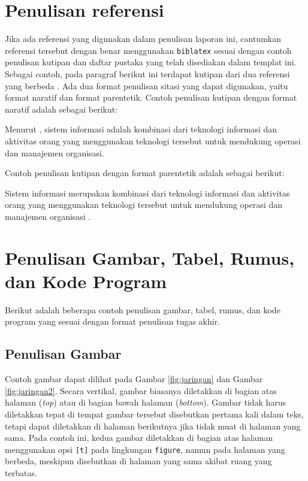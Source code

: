 \section{Penulisan referensi}
Jika ada referensi yang digunakan dalam penulisan laporan ini, cantumkan referensi tersebut dengan benar menggunakan \texttt{biblatex} sesuai dengan contoh penulisan kutipan dan daftar pustaka yang telah disediakan dalam templat ini.
Sebagai contoh, pada paragraf berikut ini terdapat kutipan dari dua referensi yang berbeda \autocite{laudon2020, pressman2019}. 
Ada dua format penulisan sitasi yang dapat digunakan, yaitu format naratif dan format parentetik.
Contoh penulisan kutipan dengan format naratif adalah sebagai berikut:
\begin{displayquote}
Menurut \textcite{laudon2020}, sistem informasi adalah kombinasi dari teknologi informasi dan aktivitas orang yang menggunakan teknologi tersebut untuk mendukung operasi dan manajemen organisasi.
\end{displayquote}
Contoh penulisan kutipan dengan format parentetik adalah sebagai berikut:
\begin{displayquote}
    Sistem informasi merupakan kombinasi dari teknologi informasi dan aktivitas orang yang menggunakan teknologi tersebut untuk mendukung operasi dan manajemen organisasi \autocite{laudon2020}.
\end{displayquote}

\section{Penulisan Gambar, Tabel, Rumus, dan Kode Program}
Berikut adalah beberapa contoh penulisan gambar, tabel, rumus, dan kode program yang sesuai dengan format penulisan tugas akhir.
\subsection{Penulisan Gambar}
Contoh gambar dapat dilihat pada Gambar \ref{fig:jaringan} dan Gambar \ref{fig:jaringan2}.
Secara vertikal, gambar biasanya diletakkan di bagian atas halaman (\textit{top}) atau di bagian bawah halaman (\textit{bottom}).
Gambar tidak harus diletakkan tepat di tempat gambar tersebut disebutkan pertama kali dalam teks,
tetapi dapat diletakkan di halaman berikutnya jika tidak muat di halaman yang sama. Pada contoh ini, kedua gambar diletakkan di bagian atas halaman 
menggunakan opsi \texttt{[t]} pada lingkungan \texttt{figure}, namun pada halaman yang berbeda, meskipun disebutkan di halaman yang sama akibat ruang yang terbatas. 

